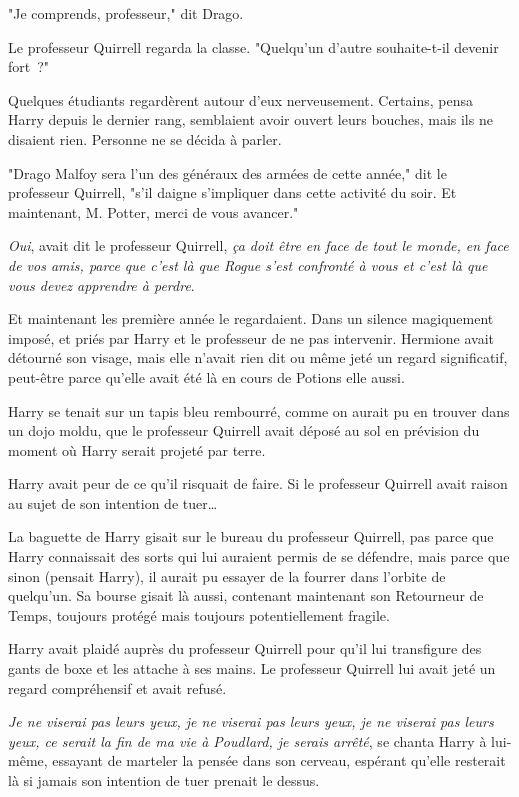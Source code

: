 "Je comprends, professeur," dit Drago.

Le professeur Quirrell regarda la classe. "Quelqu'un d'autre souhaite-t-il devenir fort~?"

Quelques étudiants regardèrent autour d'eux nerveusement. Certains, pensa Harry depuis le dernier rang, semblaient avoir ouvert leurs bouches, mais ils ne disaient rien. Personne ne se décida à parler.

"Drago Malfoy sera l'un des généraux des armées de cette année," dit le professeur Quirrell, "s'il daigne s'impliquer dans cette activité du soir. Et maintenant, M. Potter, merci de vous avancer."

\later

\emph{Oui}, avait dit le professeur Quirrell, \emph{ça doit être en face de tout le monde, en face de vos amis, parce que c'est là que Rogue s'est confronté à vous et c'est là que vous devez apprendre à perdre}.

Et maintenant les première année le regardaient. Dans un silence magiquement imposé, et priés par Harry et le professeur de ne pas intervenir. Hermione avait détourné son visage, mais elle n'avait rien dit ou même jeté un regard significatif, peut-être parce qu'elle avait été là en cours de Potions elle aussi.

Harry se tenait sur un tapis bleu rembourré, comme on aurait pu en trouver dans un dojo moldu, que le professeur Quirrell avait déposé au sol en prévision du moment où Harry serait projeté par terre.

Harry avait peur de ce qu'il risquait de faire. Si le professeur Quirrell avait raison au sujet de son intention de tuer…

La baguette de Harry gisait sur le bureau du professeur Quirrell, pas parce que Harry connaissait des sorts qui lui auraient permis de se défendre, mais parce que sinon (pensait Harry), il aurait pu essayer de la fourrer dans l'orbite de quelqu'un. Sa bourse gisait là aussi, contenant maintenant son Retourneur de Temps, toujours protégé mais toujours potentiellement fragile.

Harry avait plaidé auprès du professeur Quirrell pour qu'il lui transfigure des gants de boxe et les attache à ses mains. Le professeur Quirrell lui avait jeté un regard compréhensif et avait refusé.

\emph{Je ne viserai pas leurs yeux, je ne viserai pas leurs yeux, je ne viserai pas leurs yeux, ce serait la fin de ma vie à Poudlard, je serais arrêté}, se chanta Harry à lui-même, essayant de marteler la pensée dans son cerveau, espérant qu'elle resterait là si jamais son intention de tuer prenait le dessus.

